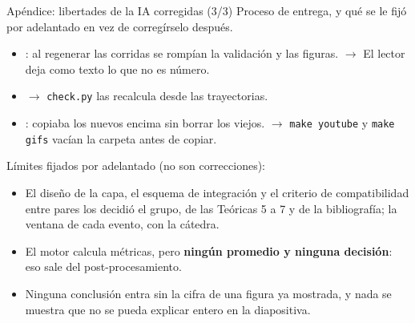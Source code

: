 \documentclass[aspectratio=169,11pt]{beamer}
\begin{document}
\begin{frame}[noframenumbering]{Apéndice: libertades de la IA corregidas (3/3)}
    \vspace{-0.2em}
    {\scriptsize\color{gris} Proceso de entrega, y qué se le fijó por adelantado
     en vez de corregírselo después.}
    \vspace{0.4em}
    \footnotesize
    \begin{itemize}\setlength{\itemsep}{0.5em}
        \item {}: al regenerar las
              corridas se rompían la validación y las figuras. $\to$ El lector
              deja como texto lo que no es número.
        \item {}
              $\to$ \texttt{check.py} las recalcula desde las trayectorias.
        \item {}: copiaba los nuevos encima sin borrar los viejos.
              $\to$ \texttt{make youtube} y \texttt{make gifs} vacían la carpeta
              antes de copiar.
    \end{itemize}
    \vspace{0.8em}
    {\scriptsize\color{gris} Límites fijados por adelantado (no son correcciones):}
    \vspace{0.2em}
    \footnotesize
    \begin{itemize}\setlength{\itemsep}{0.42em}
        \item El diseño de la capa, el esquema de integración y el criterio de
              compatibilidad entre pares los decidió el grupo, de las Teóricas 5
              a 7 y de la bibliografía; la ventana de cada evento, con la cátedra.
        \item El motor calcula métricas, pero \textbf{ningún promedio y ninguna
              decisión}: eso sale del post-procesamiento.
        \item Ninguna conclusión entra sin la cifra de una figura ya mostrada, y
              nada se muestra que no se pueda explicar entero en la diapositiva.
    \end{itemize}
\end{frame}
\end{document}
